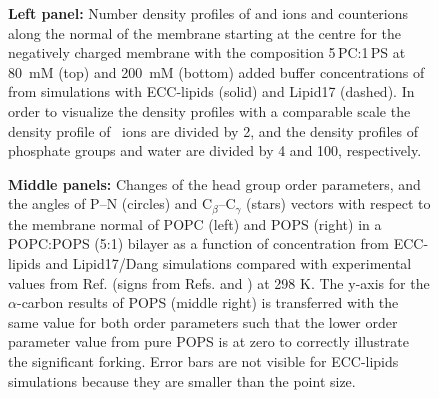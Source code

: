 \documentclass[journal=jpcbfk,manuscript=article]{achemso}
\begin{document}
\begin{figure}[tbp!]
  \caption{\label{fig:cacl-dens_PCPS} 
    \textbf{Left panel:}
    Number density profiles of  and  ions and  counterions 
    along the normal of the membrane starting at the centre
    for the negatively charged membrane with the composition 5\,PC:1\,PS
    at 80~mM (top) and 200~mM (bottom) added buffer concentrations of  from simulations with ECC-lipids (solid) and Lipid17 (dashed). 
    In order to visualize the density profiles with a comparable scale 
    the density profile of~ ions are divided by 2, and 
    the density profiles of phosphate groups and water are divided by 4 and 100, respectively.  
  }
  \caption{\label{fig:delta_ordPar_CaCl_PCPS} 
    \textbf{Middle panels:}
    Changes of the head group order parameters, and the angles of P--N (circles) and C$_\beta$--C$_\gamma$ (stars) vectors 
    with respect to the membrane normal of POPC (left) and POPS (right) in a POPC:POPS (5:1) bilayer 
    as a function of  concentration from ECC-lipids and Lipid17/Dang simulations 
    compared with experimental values from Ref.  (signs from Refs.  and ) at 298 K.
    The y-axis for the $\alpha$-carbon results of POPS (middle right) is transferred
    with the same value for both order parameters such that the lower order
    parameter value from pure POPS is at zero to correctly illustrate the significant forking.
    Error bars are not visible for ECC-lipids simulations because they are smaller than the point size.
  }

\end{figure}
\end{document}

